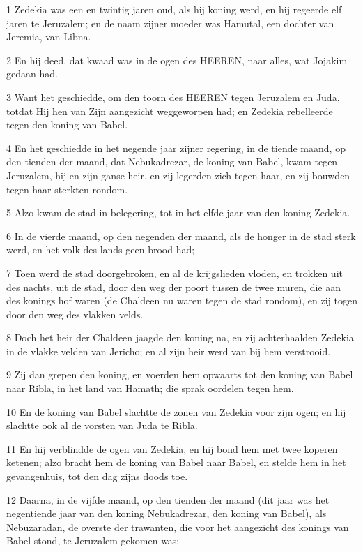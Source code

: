\par 1 Zedekia was een en twintig jaren oud, als hij koning werd, en hij regeerde elf jaren te Jeruzalem; en de naam zijner moeder was Hamutal, een dochter van Jeremia, van Libna.
\par 2 En hij deed, dat kwaad was in de ogen des HEEREN, naar alles, wat Jojakim gedaan had.
\par 3 Want het geschiedde, om den toorn des HEEREN tegen Jeruzalem en Juda, totdat Hij hen van Zijn aangezicht weggeworpen had; en Zedekia rebelleerde tegen den koning van Babel.
\par 4 En het geschiedde in het negende jaar zijner regering, in de tiende maand, op den tienden der maand, dat Nebukadrezar, de koning van Babel, kwam tegen Jeruzalem, hij en zijn ganse heir, en zij legerden zich tegen haar, en zij bouwden tegen haar sterkten rondom.
\par 5 Alzo kwam de stad in belegering, tot in het elfde jaar van den koning Zedekia.
\par 6 In de vierde maand, op den negenden der maand, als de honger in de stad sterk werd, en het volk des lands geen brood had;
\par 7 Toen werd de stad doorgebroken, en al de krijgslieden vloden, en trokken uit des nachts, uit de stad, door den weg der poort tussen de twee muren, die aan des konings hof waren (de Chaldeen nu waren tegen de stad rondom), en zij togen door den weg des vlakken velds.
\par 8 Doch het heir der Chaldeen jaagde den koning na, en zij achterhaalden Zedekia in de vlakke velden van Jericho; en al zijn heir werd van bij hem verstrooid.
\par 9 Zij dan grepen den koning, en voerden hem opwaarts tot den koning van Babel naar Ribla, in het land van Hamath; die sprak oordelen tegen hem.
\par 10 En de koning van Babel slachtte de zonen van Zedekia voor zijn ogen; en hij slachtte ook al de vorsten van Juda te Ribla.
\par 11 En hij verblindde de ogen van Zedekia, en hij bond hem met twee koperen ketenen; alzo bracht hem de koning van Babel naar Babel, en stelde hem in het gevangenhuis, tot den dag zijns doods toe.
\par 12 Daarna, in de vijfde maand, op den tienden der maand (dit jaar was het negentiende jaar van den koning Nebukadrezar, den koning van Babel), als Nebuzaradan, de overste der trawanten, die voor het aangezicht des konings van Babel stond, te Jeruzalem gekomen was;
